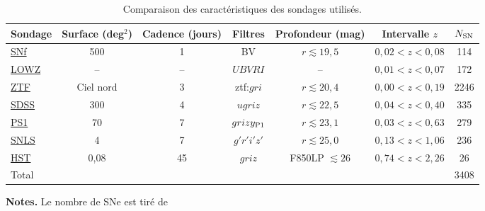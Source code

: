 \documentclass[../main/main.tex]{subfiles}
\begin{document}
\vfill
\shorthandoff{:}
\begin{table}[ht]
    \centerfloat
    \begin{threeparttable}
        \caption{Comparaison des caractéristiques des sondages utilisés.}
        \label{tab:sondcomp}
        \begin{tabular}{lcccccc}
            \toprule
            Sondage              &
            Surface (deg$^2$)    & Cadence (jours)   & Filtres          &
            Profondeur (mag)     & Intervalle $z$    & $N_{\rm SN}$\\
            \midrule
            \hyperref[sec:snf]{SNf}                      &
            500                      & 1                 & BV               &
            $r \lesssim 19,5$        & $0,02 < z < 0,08$ & 114\\
            \hyperref[sec:lowz]{LOWZ}\tnote{1}           &
            --                       & --                & $UBVRI$          &
            --                       & $0,01 < z < 0,07$ & 172\\
            \hyperref[sec:ztf]{ZTF}                      &
            Ciel nord                & 3                 & ztf:$gri$        &
            $r \lesssim 20,4$        & $0,00 < z < 0,19$ & 2246\\
            \hyperref[sec:sdss]{SDSS}                    &
            300                      & 4                 & $ugriz$          &
            $r \lesssim 22,5$        & $0,04 < z < 0,40$ & 335\\
            \hyperref[sec:ps1]{PS1}                      &
            70                       & 7                 & $grizy_{\rm P1}$ &
            $r \lesssim 23,1$        & $0,03 < z < 0,63$ & 279\\
            \hyperref[sec:snls]{SNLS}                    &
            4                        & 7                 & $g'r'i'z'$       &
            $r \lesssim 25,0$        & $0,13 < z < 1,06$ & 236\\
            \hyperref[sec:hst]{HST}\tnote{2}             &
            0,08                     & 45                & $griz$\tnote{3}  &
            F850LP $\lesssim 26$     & $0,74 < z < 2,26$ & 26\\
            \midrule
            Total & \multicolumn{5}{c}{} & 3408\tnote{4}\\
            \bottomrule
        \end{tabular}
        \begin{tablenotes}[flushleft]
        \item \textbf{\hspace{-3,2pt}Notes.} Le nombre de SNe est tiré de

\end{tablenotes}
\end{threeparttable}
\end{table}
\end{document}
